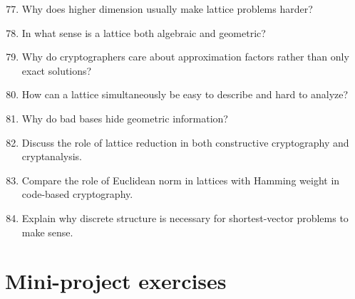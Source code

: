 \documentclass[11pt]{article}
\begin{document}
\begin{enumerate}
	\setcounter{enumi}{76}
	\item Why does higher dimension usually make lattice problems harder?
	
	\item In what sense is a lattice both algebraic and geometric?
	
	\item Why do cryptographers care about approximation factors rather than only exact solutions?
	
	\item How can a lattice simultaneously be easy to describe and hard to analyze?
	
	\item Why do bad bases hide geometric information?
	
	\item Discuss the role of lattice reduction in both constructive cryptography and cryptanalysis.
	
	\item Compare the role of Euclidean norm in lattices with Hamming weight in code-based cryptography.
	
	\item Explain why discrete structure is necessary for shortest-vector problems to make sense.
\end{enumerate}

\section{Mini-project exercises}
\end{document}
